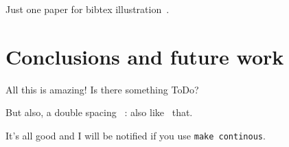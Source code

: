
Just one paper for bibtex illustration~\cite{rogers1967person}.

\section{Conclusions and future work}
\label{sec:concl}
All this is amazing!
Is there something ToDo?

But also, a double spacing ~:
also like~ that.

It's all good and I will be notified if you use {\tt make continous}.

